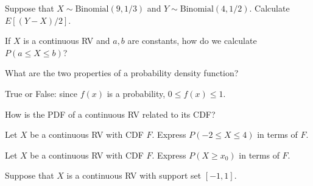 \documentclass[addpoints,12pt]{exam}
\begin{document}
\begin{questions}
\question Suppose that $X \sim \text{Binomial}(9, 1/3)$ and $Y \sim \text{Binomial}(4, 1/2)$. Calculate $E[(Y - X) / 2]$. 



%

\question If $X$ is a continuous RV and $a,b$ are constants, how do we calculate $P(a \leq X \leq b)$?

\question What are the two properties of a probability density function? 

\question True or False: since $f(x)$ is a probability, $0\leq f(x) \leq 1$.

\question How is the PDF of a continuous RV related to its CDF?

\question Let $X$ be a continuous RV with CDF $F$. Express $P(-2 \leq X \leq 4)$ in terms of $F$.

\question Let $X$ be a continuous RV with CDF $F$. Express $P(X \geq x_0)$ in terms of $F$.

\question Suppose that $X$ is a continuous RV with support set $[-1,1]$.
\end{questions}
\end{document}
